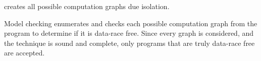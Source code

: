 \begin{theorem}
 creates all possible computation graphs due isolation. 
\end{theorem}

Model checking enumerates and checks each possible computation graph from the program to determine if it is data-race free. Since every graph is considered, and the technique is sound and complete, only programs that are truly data-race free are accepted.

